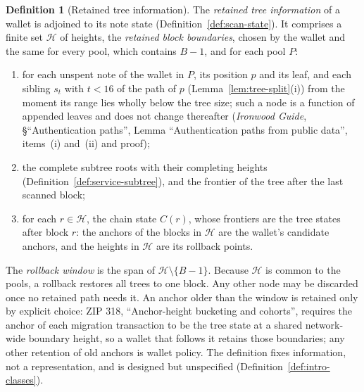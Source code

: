 \documentclass[11pt,a4paper]{article}
\theoremstyle{definition}
\newtheorem{definition}[theorem]{Definition}
\begin{document}
\begin{definition}[Retained tree information]\label{def:tree-retained}
The \emph{retained tree information} of a wallet is adjoined to its note
state (Definition~\ref{def:scan-state}). It comprises a finite set
$\mathcal{H}$ of heights, the \emph{retained block boundaries}, chosen by
the wallet and the same for every pool, which contains $B - 1$, and for
each pool $P$:
\begin{enumerate}[label=(\alph*)]
\item for each unspent note of the wallet in $P$, its position $p$ and its
  leaf, and each sibling $s_t$ with $t < 16$ of the path of $p$
  (Lemma~\ref{lem:tree-split}(i)) from the moment its range lies wholly
  below the tree size; such a node is a function of appended leaves and
  does not change thereafter (\emph{Ironwood Guide}, \S``Authentication paths'',
  Lemma ``Authentication paths from public data'', items~(i) and~(ii) and
  proof);
\item the complete subtree roots with their completing heights
  (Definition~\ref{def:service-subtree}), and the frontier of the tree
  after the last scanned block;
\item for each $r \in \mathcal{H}$, the chain state $C(r)$, whose
  frontiers are the tree states after block $r$: the anchors of the blocks
  in $\mathcal{H}$ are the wallet's candidate anchors, and the heights in
  $\mathcal{H}$ are its rollback points.
\end{enumerate}
The \emph{rollback window} is the span of $\mathcal{H} \setminus
\{B - 1\}$. Because $\mathcal{H}$ is common to the pools, a rollback
restores all trees to one block. Any other node may be discarded once no
retained path needs it. An anchor older than the window is retained only by
explicit choice: ZIP 318, ``Anchor-height bucketing and cohorts'', requires
the anchor of each migration transaction to be the tree state at a shared
network-wide boundary height, so a wallet that follows it retains those
boundaries; any other retention of old anchors is wallet policy. The
definition fixes information, not a representation, and is designed but
unspecified (Definition~\ref{def:intro-classes}).
\end{definition}
\end{document}
